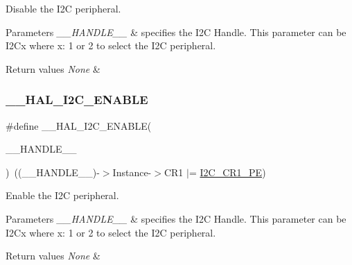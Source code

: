 Disable the I2C peripheral. 


\begin{DoxyParams}{Parameters}
{\em \+\_\+\+\_\+\+H\+A\+N\+D\+L\+E\+\_\+\+\_\+} & specifies the I2C Handle. This parameter can be I2\+Cx where x\+: 1 or 2 to select the I2C peripheral. \\
\hline
\end{DoxyParams}

\begin{DoxyRetVals}{Return values}
{\em None} & \\
\hline
\end{DoxyRetVals}
\mbox{\label{group___i2_c___exported___macros_gacff412c47b0c1d63ef3b2a07f65988b7}} 
\subsubsection{\texorpdfstring{\+\_\+\+\_\+\+H\+A\+L\+\_\+\+I2\+C\+\_\+\+E\+N\+A\+B\+LE}{\_\_HAL\_I2C\_ENABLE}}
{\footnotesize\ttfamily \#define \+\_\+\+\_\+\+H\+A\+L\+\_\+\+I2\+C\+\_\+\+E\+N\+A\+B\+LE(\begin{DoxyParamCaption}\item[{}]{\+\_\+\+\_\+\+H\+A\+N\+D\+L\+E\+\_\+\+\_\+ }\end{DoxyParamCaption})~((\+\_\+\+\_\+\+H\+A\+N\+D\+L\+E\+\_\+\+\_\+)-\/$>$Instance-\/$>$C\+R1 $\vert$=  \mbox{\hyperlink{group___peripheral___registers___bits___definition_ga953b0d38414808db79da116842ed3262}{I2\+C\+\_\+\+C\+R1\+\_\+\+PE}})}



Enable the I2C peripheral. 


\begin{DoxyParams}{Parameters}
{\em \+\_\+\+\_\+\+H\+A\+N\+D\+L\+E\+\_\+\+\_\+} & specifies the I2C Handle. This parameter can be I2\+Cx where x\+: 1 or 2 to select the I2C peripheral. \\
\hline
\end{DoxyParams}

\begin{DoxyRetVals}{Return values}
{\em None} & \\
\hline
\end{DoxyRetVals}
\mbox{\label{group___i2_c___exported___macros_gac9d8b249b06b2d30f987acc9ceebd1d9}} 
